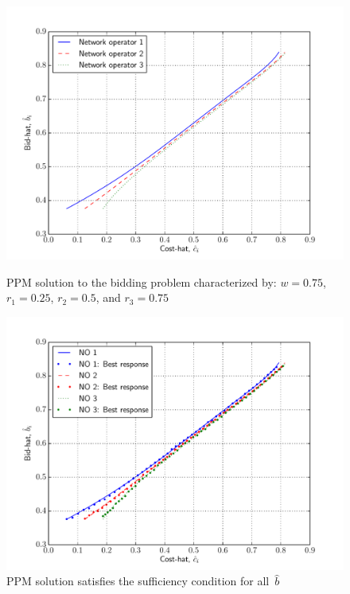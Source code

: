 \begin{figure}[p!]
  \includegraphics[width=\figsize]{Indirect/Figures/polynomial_projection_3}
  \caption{PPM solution to the bidding problem characterized by: $w=0.75$, $r_1 = 0.25$, $r_2 = 0.5$, and $r_3 = 0.75$}
  \label{fig:polynomial_projection_3_indirect}
  \vspace{10mm}
  \includegraphics[width=\figsize]{Indirect/Figures/polynomial_projection_3_sufficiency}
  \caption{PPM solution satisfies the sufficiency condition for all~$\hat{b}$}
  \label{fig:polynomial_projection_3_sufficiency_indirect}
\end{figure}


